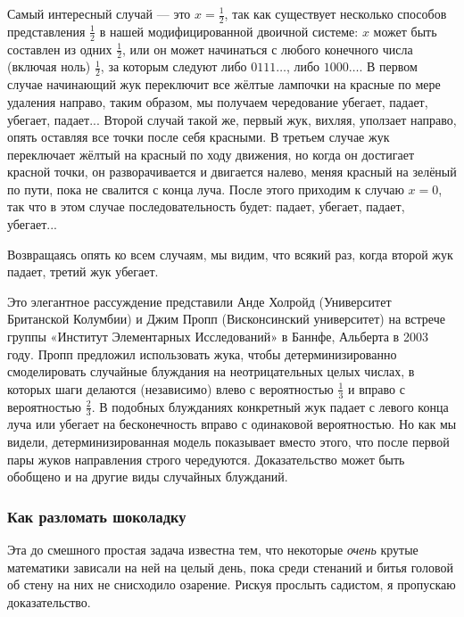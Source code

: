 Самый интересный случай --- это $x=\tfrac12$, так как существует несколько способов представления $\tfrac12$ в нашей модифицированной двоичной системе: $x$ может быть составлен из одних $\tfrac12$, или он может начинаться с любого конечного числа (включая ноль) $\tfrac12$, за которым следуют либо $0111\dots$, либо $1000\dots$.
В первом случае начинающий жук переключит все жёлтые лампочки на красные по мере удаления направо, таким образом, мы получаем чередование  убегает, падает, убегает, падает...
Второй случай такой же, первый жук, вихляя, уползает направо, опять оставляя все точки после себя красными.
В третьем случае жук переключает жёлтый на красный по ходу движения, но когда он достигает красной точки, он разворачивается и двигается налево, меняя красный на зелёный по пути, пока не свалится с конца луча.
После этого приходим к случаю $x = 0$, так что в этом случае  последовательность будет: падает, убегает, падает, убегает...

Возвращаясь опять ко всем случаям, мы видим, что всякий раз, когда второй жук падает, третий жук убегает.
\heart

Это элегантное рассуждение представили
Анде Холройд (Университет Британской Колумбии) и Джим Пропп (Висконсинский университет) на встрече группы «Институт Элементарных Исследований» в Баннфе, Альберта в 2003 году. %
Пропп предложил использовать жука, чтобы детерминизированно смоделировать случайные блуждания на неотрицательных целых числах, в которых шаги делаются (независимо) влево с вероятностью $\tfrac13$ и вправо с вероятностью $\tfrac23$.
В подобных блужданиях конкретный жук падает с левого конца луча или убегает на бесконечность вправо с одинаковой вероятностью.
Но как мы видели, детерминизированная модель показывает вместо этого, что после первой пары жуков направления строго чередуются.
Доказательство может быть обобщено и на другие виды случайных блужданий.

\subsubsection*{Как разломать шоколадку}%

Эта до смешного простая задача известна тем, что некоторые \emph{очень} крутые математики зависали на ней на целый день, пока среди  стенаний и битья головой об стену на них не снисходило озарение.
Рискуя прослыть садистом, я пропускаю доказательство.
